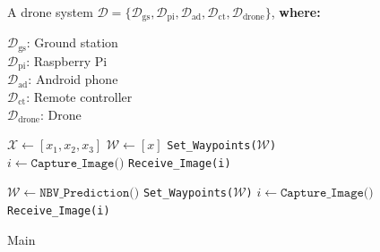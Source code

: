 \begin{figure}[tbh!]
\centering
\begin{minipage}{\linewidth}
\begin{algorithm}[H]
\caption{\textcolor[HTML]{D2EBF0}{Main}}
\label{alg:main}
\begin{algorithmic}[1]
\Require A drone system 
$\mathcal{D} = \{\mathcal{D}_\text{gs}, \mathcal{D}_\text{pi}, \mathcal{D}_\text{ad}, \mathcal{D}_\text{ct}, \mathcal{D}_\text{drone}\}$, \textbf{where:}
\begin{flushleft}
\hspace{1em} $\mathcal{D}_\text{gs}$: Ground station \\
\hspace{1em} $\mathcal{D}_\text{pi}$: Raspberry Pi \\
\hspace{1em} $\mathcal{D}_\text{ad}$: Android phone \\
\hspace{1em} $\mathcal{D}_\text{ct}$: Remote controller \\
\hspace{1em} $\mathcal{D}_\text{drone}$: Drone
\end{flushleft}

\State $\mathcal{X} \gets [x_1, x_2, x_3]$ 
    \State $\mathcal{W} \gets [x]$ 
    \State \textcolor[HTML]{682C99}{\texttt{Set\_Waypoints($\mathcal{W}$)}} \Comment{\textcolor[HTML]{682C99}{Move the drone (Alg. 2)}}
    \State \textcolor[HTML]{D00402}{$i \gets \texttt{Capture\_Image()}$} \Comment{\textcolor[HTML]{D00402}{Capture an image (Alg. 3)}}
    \State \textcolor[HTML]{069F48}{\texttt{Receive\_Image(i)}} \Comment{\textcolor[HTML]{069F48}{Transmit image (Alg. 4)}}
\EndFor

    \State \textcolor[HTML]{06AFF5}{$\mathcal{W} \gets \texttt{NBV\_Prediction()}$} \Comment{\textcolor[HTML]{06AFF5}{Predict NBV (Alg. 5)}}
    \State \textcolor[HTML]{682C99}{\texttt{Set\_Waypoints($\mathcal{W}$)}} \Comment{\textcolor[HTML]{682C99}{Move to NBV (Alg. 2)}}
    \State \textcolor[HTML]{D00402}{$i \gets \texttt{Capture\_Image()}$} \Comment{\textcolor[HTML]{D00402}{Capture an image (Alg. 3)}}
    \State \textcolor[HTML]{069F48}{\texttt{Receive\_Image(i)}} \Comment{\textcolor[HTML]{069F48}{Transmit image (Alg. 4)}}
\EndFor

\end{algorithmic}
\end{algorithm}
\end{minipage}
\end{figure}

